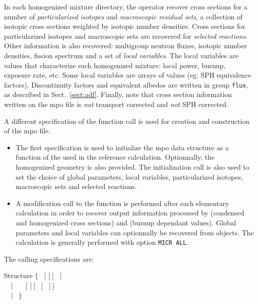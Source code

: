In each homogenized mixture directory, the  operator recover
cross sections for a number of {\sl particularized isotopes} and {\sl macroscopic
residual sets}, a collection of isotopic cross sections weighted by isotopic number densities.
Cross sections for particularized isotopes and macroscopic sets are recovered for
{\sl selected reactions}. Other information is also recovered: multigroup neutron
fluxes, isotopic number densities, fission spectrum and a set
of {\sl local variables}. The local variables are values that characterize each
homogenized mixture: local power, burnup, exposure rate, etc. Some local variables
are arrays of values (eg: SPH equivalence factors). Discontinuity factors and equivalent albedos
are written in group {\tt flux}, as described in Sect.~\ref{sect:adf}. Finally, note that cross section
information written on the {\sc mpo} file is {\sl not} transport corrected and {\sl not}
SPH corrected.

\vskip 0.1cm

A different specification of the  function call is used for
creation and construction of the {\sc mpo} file.
\begin{itemize}
\item The first specification is used to initialize the {\sc mpo} data structure
as a function of the  used in the reference calculation. Optionnally,
the homogenized geometry is also provided. The initialization call is also used to
set the choice of global parameters, local variables, particularized isotopes,
macroscopic sets and selected reactions.
\item A modification call to the  function is performed after each
elementary calculation in order to recover output information processed by 
(condensed and homogenized cross sections) and  (burnup dependant values).
Global parameters and local variables can optionnally be recovered from 
objects. The  calculation is generally performed with option {\tt MICR ALL}.
\end{itemize}

The calling specifications are:

\vskip -0.5cm

\begin{DataStructure}{Structure }
$\{$~ \moc{:=}  $[$  $]~[$~ $]$ \moc{::}  \\
~~$|$~ \moc{:=}  ~~$[$  $]~[$ ~$[$~ $]~]$ \moc{::}  \\
~~$|$~ \moc{:=}    \moc{::}  $\}$ \\
\end{DataStructure}

